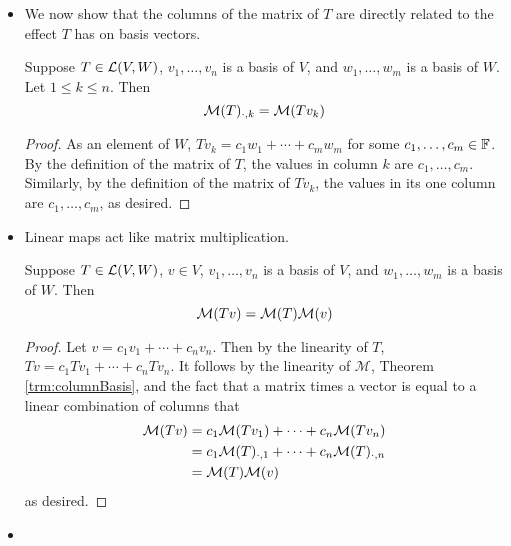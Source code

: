 \documentclass[../main.tex]{subfiles}
\begin{document}
\begin{itemize}
\begin{equation*}
    \end{equation*}
    \item We now show that the columns of the matrix of $T$ are directly related to the effect $T$ has on basis vectors.
    \begin{theorem}\label{trm:columnBasis}
        Suppose $T\in\mathcal{L}(V,W)$, $v_1,\dots,v_n$ is a basis of $V$, and $w_1,\dots,w_m$ is a basis of $W$. Let $1\leq k\leq n$. Then
        \begin{equation*}
            \mathcal{M}(T)_{\cdot,k} = \mathcal{M}(Tv_k)
        \end{equation*}
        \begin{proof}
            As an element of $W$, $Tv_k=c_1w_1+\cdots+c_mw_m$ for some $c_1,\dots,c_m\in\mathbb{F}$. By the definition of the matrix of $T$, the values in column $k$ are $c_1,\dots,c_m$. Similarly, by the definition of the matrix of $Tv_k$, the values in its one column are $c_1,\dots,c_m$, as desired.
        \end{proof}
    \end{theorem}
    \item Linear maps act like matrix multiplication.
    \begin{theorem}
        Suppose $T\in\mathcal{L}(V,W)$, $v\in V$, $v_1,\dots,v_n$ is a basis of $V$, and $w_1,\dots,w_m$ is a basis of $W$. Then
        \begin{equation*}
            \mathcal{M}(Tv) = \mathcal{M}(T)\mathcal{M}(v)
        \end{equation*}
        \begin{proof}
            Let $v=c_1v_1+\cdots+c_nv_n$. Then by the linearity of $T$, $Tv=c_1Tv_1+\cdots+c_nTv_n$. It follows by the linearity of $\mathcal{M}$, Theorem \ref{trm:columnBasis}, and the fact that a matrix times a vector is equal to a linear combination of columns that
            \begin{align*}
                \mathcal{M}(Tv) &= c_1\mathcal{M}(Tv_1)+\cdots+c_n\mathcal{M}(Tv_n)\\
                &= c_1\mathcal{M}(T)_{\cdot,1}+\cdots+c_n\mathcal{M}(T)_{\cdot,n}\\
                &= \mathcal{M}(T)\mathcal{M}(v)
            \end{align*}
            as desired.
        \end{proof}
    \end{theorem}
    \item {}

\end{itemize}
\end{document}
